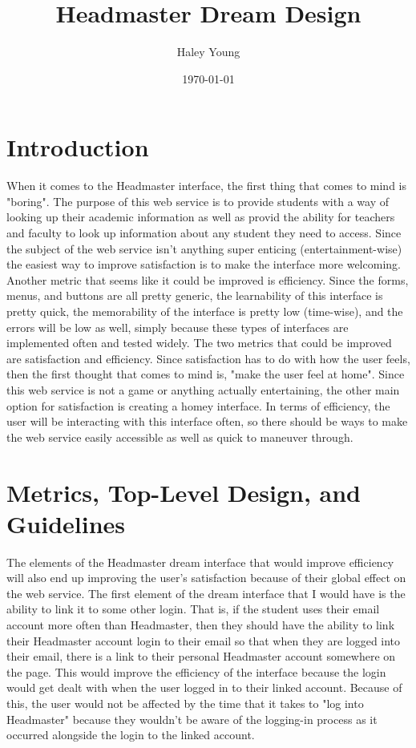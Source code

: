 \documentclass{article}
\title{Headmaster Dream Design}
\author{Haley Young}
\date{\today}
\begin{document}
\maketitle

\pagebreak
\tableofcontents
\pagebreak

\section{Introduction}

When it comes to the Headmaster interface, the first thing that comes to mind is "boring". The purpose of this web service is to provide students with a way of looking up their academic information as well as provid the ability for teachers and faculty to look up information about any student they need to access. Since the subject of the web service isn’t anything super enticing (entertainment-wise) the easiest way to improve satisfaction is to make the interface more welcoming. Another metric that seems like it could be improved is efficiency. Since the forms, menus, and buttons are all pretty generic, the learnability of this interface is pretty quick, the memorability of the interface is pretty low (time-wise), and the errors will be low as well, simply because these types of interfaces are implemented often and tested widely. The two metrics that could be improved are satisfaction and efficiency. Since satisfaction has to do with how the user feels, then the first thought that comes to mind is, "make the user feel at home". Since this web service is not a game or anything actually entertaining, the other main option for satisfaction is creating a homey interface. In terms of efficiency, the user will be interacting with this interface often, so there should be ways to make the web service easily accessible as well as quick to maneuver through. 

\section{Metrics, Top-Level Design, and Guidelines}

The elements of the Headmaster dream interface that would improve efficiency will also end up improving the user's satisfaction because of their global effect on the web service. The first element of the dream interface that I would have is the ability to link it to some other login. That is, if the student uses their email account more often than Headmaster, then they should have the ability to link their Headmaster account login to their email so that when they are logged into their email, there is a link to their personal Headmaster account somewhere on the page. This would improve the efficiency of the interface because the login would get dealt with when the user logged in to their linked account. Because of this, the user would not be affected by the time that it takes to "log into Headmaster" because they wouldn't be aware of the logging-in process as it occurred alongside the login to the linked account.
\end{document}
